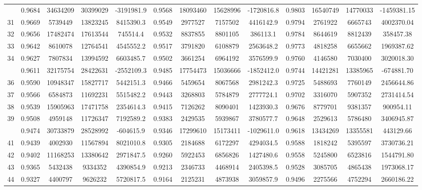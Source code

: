 \documentclass[
  12pt,
]{article}
\begin{document}
\begin{longtable}[t]{lcccccccccccc}
\addlinespace
30 & 0.9684 & 34634209 & 30399029 & -3191981.9 & 0.9568 & 18093460 & 15628996 & -1720816.8 & 0.9803 & 16540749 & 14770033 & -1459381.15\\
31 & 0.9669 & 5739449 & 13823245 & 8415390.3 & 0.9549 & 2977527 & 7157502 & 4416142.9 & 0.9794 & 2761922 & 6665743 & 4002370.04\\
32 & 0.9656 & 17482474 & 17613544 & 745514.4 & 0.9532 & 8837855 & 8801105 & 386113.1 & 0.9784 & 8644619 & 8812439 & 358457.38\\
33 & 0.9642 & 8610078 & 12764541 & 4545552.2 & 0.9517 & 3791820 & 6108879 & 2563648.2 & 0.9773 & 4818258 & 6655662 & 1969387.62\\
34 & 0.9627 & 7807834 & 13994592 & 6603485.7 & 0.9502 & 3661254 & 6964192 & 3576599.9 & 0.9760 & 4146580 & 7030400 & 3020018.30\\
\addlinespace
35 & 0.9611 & 32175754 & 28422631 & -2552109.3 & 0.9485 & 17754473 & 15036666 & -1852412.0 & 0.9744 & 14421281 & 13385965 & -674881.70\\
36 & 0.9590 & 10948347 & 15827717 & 5442151.3 & 0.9466 & 5459654 & 8067568 & 2981242.3 & 0.9725 & 5488693 & 7760149 & 2456644.86\\
37 & 0.9566 & 6584873 & 11692231 & 5515482.2 & 0.9443 & 3268803 & 5784879 & 2777724.1 & 0.9702 & 3316070 & 5907352 & 2731414.54\\
38 & 0.9539 & 15905963 & 17471758 & 2354614.3 & 0.9415 & 7126262 & 8090401 & 1423930.3 & 0.9676 & 8779701 & 9381357 & 900954.11\\
39 & 0.9508 & 4959148 & 11726347 & 7192589.2 & 0.9383 & 2429535 & 5939867 & 3780577.7 & 0.9648 & 2529613 & 5786480 & 3406945.87\\
\addlinespace
40 & 0.9474 & 30733879 & 28528992 & -604615.9 & 0.9346 & 17299610 & 15173411 & -1029611.0 & 0.9618 & 13434269 & 13355581 & 443129.66\\
41 & 0.9439 & 4002930 & 11567894 & 8021010.8 & 0.9305 & 2184688 & 6172297 & 4294034.5 & 0.9588 & 1818242 & 5395597 & 3730736.21\\
42 & 0.9402 & 11168253 & 13380642 & 2971847.5 & 0.9260 & 5922453 & 6856826 & 1427480.6 & 0.9558 & 5245800 & 6523816 & 1544791.80\\
43 & 0.9365 & 5432438 & 9334352 & 4390854.9 & 0.9213 & 2346733 & 4468914 & 2405398.5 & 0.9528 & 3085705 & 4865438 & 1973068.17\\
44 & 0.9327 & 4400797 & 9626232 & 5720817.5 & 0.9164 & 2125231 & 4873938 & 3059857.9 & 0.9496 & 2275566 & 4752294 & 2660186.22\\

\end{longtable}
\end{document}
